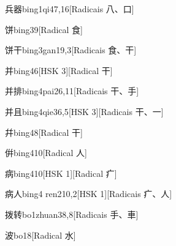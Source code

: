 \begin{entry}{兵器}{bing1qi4}{7,16}[Radicais ⼋、⼝]
\end{entry}

\begin{entry}{饼}{bing3}{9}[Radical ⾷]
\end{entry}

\begin{entry}{饼干}{bing3gan1}{9,3}[Radicais ⾷、⼲]
\end{entry}

\begin{entry}{并}{bing4}{6}[HSK 3][Radical ⼲]
\end{entry}

\begin{entry}{并排}{bing4pai2}{6,11}[Radicais ⼲、⼿]
\end{entry}

\begin{entry}{并且}{bing4qie3}{6,5}[HSK 3][Radicais ⼲、⼀]
\end{entry}

\begin{entry}{幷}{bing4}{8}[Radical ⼲]
\end{entry}

\begin{entry}{倂}{bing4}{10}[Radical ⼈]
\end{entry}

\begin{entry}{病}{bing4}{10}[HSK 1][Radical ⽧]
\end{entry}

\begin{entry}{病人}{bing4 ren2}{10,2}[HSK 1][Radicais ⽧、⼈]
\end{entry}

\begin{entry}{拨转}{bo1zhuan3}{8,8}[Radicais ⼿、⾞]
\end{entry}

\begin{entry}{波}{bo1}{8}[Radical ⽔]
\end{entry}

